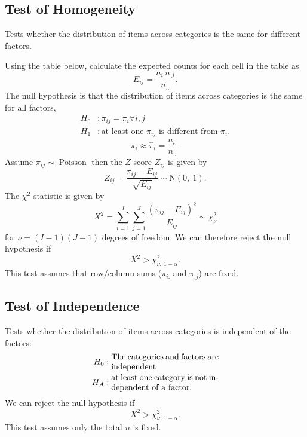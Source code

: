 \documentclass{article}
\begin{document}
\begin{multicols}{3}
    \subsection{Test of Homogeneity}
    Tests whether the distribution
    of items across categories is the same for different factors.

    Using the table below,
    calculate the expected counts for each cell in the table as
    \begin{equation*}
        E_{ij} = \frac{n_{i.} n_{.j}}{n_{..}}.
    \end{equation*}
    The null hypothesis is that the distribution of items across
    categories is the same for all factors,
    \begin{align*}
        H_0 & : \pi_{ij} = \pi_{i} \forall i, j                                 \\
        H_1 & : \text{at least one \(\pi_{ij}\) is different from \(\pi_{i}\)}.
    \end{align*}
    \begin{equation*}
        \pi_i \approx \hat{\pi}_i = \frac{n_{i.}}{n_{..}}.
    \end{equation*}
    Assume \(\pi_{ij} \sim \operatorname{Poisson}\)
    then the \(Z\)-score \(Z_{ij}\) is given by
    \begin{equation*}
        Z_{ij} = \frac{\pi_{ij} - E_{ij}}{\sqrt{E_{ij}}} \sim \mathrm{N}\left( 0,\: 1 \right).
    \end{equation*}
    The \(\chi^2\) statistic is given by
    \begin{equation*}
        X^2 = \sum_{i = 1}^I \sum_{j = 1}^J \frac{\left( \pi_{ij} - E_{ij} \right)^2}{E_{ij}} \sim \chi_{\nu}^2
    \end{equation*}
    for \(\nu = \left( I - 1 \right)\left( J - 1 \right)\) degrees of freedom. We can therefore reject the null hypothesis if
    \begin{equation*}
        X^2 > \chi_{\nu, \: 1 - \alpha}^2.
    \end{equation*}
    This test assumes that row/column sums (\(\pi_{i.}\) and \(\pi_{.j}\)) are fixed.
    \subsection{Test of Independence}
    Tests whether the distribution of items across categories is independent of the
    factors:
    \begin{align*}
        H_0 & : \text{\parbox{4.5cm}{The categories and factors are independent}}            \\
        H_A & : \text{\parbox{4.5cm}{at least one category is not independent of a factor.}}
    \end{align*}
    We can reject the null hypothesis if
    \begin{equation*}
        X^2 > \chi_{\nu, \: 1 - \alpha}^2.
    \end{equation*}
    This test assumes only the total \(n\) is fixed.

\end{multicols}
\end{document}
